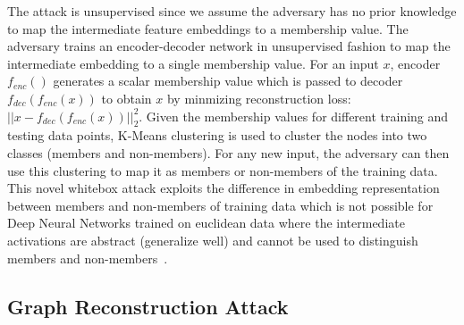 The attack is unsupervised since we assume the adversary has no prior knowledge to map the intermediate feature embeddings to a membership value. %
The adversary trains an encoder-decoder network in unsupervised fashion to map the intermediate embedding to a single membership value.
For an input $x$, encoder $f_{enc}()$ generates a scalar membership value which is passed to decoder $f_{dec}(f_{enc}(x))$ to obtain $x$ by minmizing reconstruction loss: $||x - f_{dec}(f_{enc}(x))||_2^2$.
Given the membership values for different training and testing data points, K-Means clustering is used to cluster the nodes into two classes (members and non-members).
For any new input, the adversary can then use this clustering to map it as members or non-members of the training data.
This novel whitebox attack exploits the difference in embedding representation between members and non-members of training data which is not possible for Deep Neural Networks trained on euclidean data where the intermediate activations are abstract (generalize well) and cannot be used to distinguish members and non-members~\cite{8835245}.









\subsection{Graph Reconstruction Attack}

